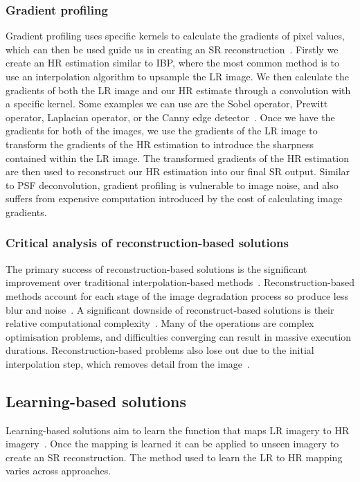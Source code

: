 \subsubsection{Gradient profiling}
Gradient profiling uses specific kernels to calculate the gradients of pixel values, which can then be used guide us in creating an SR reconstruction~\cite{ref}. Firstly we create an HR estimation similar to IBP, where the most common method is to use an interpolation algorithm to upsample the LR image. We then calculate the gradients of both the LR image and our HR estimate through a convolution with a specific kernel. Some examples we can use are the Sobel operator, Prewitt operator, Laplacian operator, or the Canny edge detector~\cite{ref}. Once we have the gradients for both of the images, we use the gradients of the LR image to transform the gradients of the HR estimation to introduce the sharpness contained within the LR image. The transformed gradients of the HR estimation are then used to reconstruct our HR estimation into our final SR output. Similar to PSF deconvolution, gradient profiling is vulnerable to image noise, and also suffers from expensive computation introduced by the cost of calculating image gradients.~\cite{ref}

\subsubsection{Critical analysis of reconstruction-based solutions}
The primary success of reconstruction-based solutions is the significant improvement over traditional interpolation-based methods~\cite{ref}. Reconstruction-based methods account for each stage of the image degradation process so produce less blur and noise~\cite{ref}. A significant downside of reconstruct-based solutions is their relative computational complexity~\cite{ref}. Many of the operations are complex optimisation problems, and difficulties converging can result in massive execution durations. Reconstruction-based problems also lose out due to the initial interpolation step, which removes detail from the image~\cite{remoteSensingGANsReview}.

\subsection{Learning-based solutions}
Learning-based solutions aim to learn the function that maps LR imagery to HR imagery~\cite{superResRemoteSensingOverview}. Once the mapping is learned it can be applied to unseen imagery to create an SR reconstruction. The method used to learn the LR to HR mapping varies across approaches.

